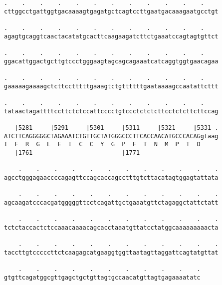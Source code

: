 \documentclass{article}
\begin{document}
\begin{Verbatim}
.    .    .    .    .    .    .    .    .    .    .    .    
cttggcctgattggtgacaaaagtgagatgctcagtccttgaatgacaaagaatgcctgt
                                                            
.    .    .    .    .    .    .    .    .    .    .    .    
agagtgcaggtcaactacatatgcacttcaagaagatcttctgaaatccagtagtgttct
                                                            
.    .    .    .    .    .    .    .    .    .    .    .    
ggacattggactgcttgtccctgggaagtagcagcagaaatcatcaggtggtgaacagaa
                                                            
.    .    .    .    .    .    .    .    .    .    .    .    
gaaaaagaaaagctcttcctttttgaaagtctgttttttgaataaaagccaatattcttt
                                                            
.    .    .    .    .    .    .    .    .    .    .    .    
tataactagattttccttctctccattcccctgtccctctctcttcctctcttcttccag
                                                            
   |5281     |5291     |5301     |5311     |5321     |5331 .
ATCTTCAGGGGGCTAGAAATCTGTTGCTATGGGCCCTTCACCAACATGCCCACAGgtaag
I  F  R  G  L  E  I  C  C  Y  G  P  F  T  N  M  P  T  D     
   |1761                         |1771                      
  
    .    .    .    .    .    .    .    .    .    .    .    .
agcctgggagaaccccagagttccagcaccagcctttgtcttacatagtggagtattata
                                                            
    .    .    .    .    .    .    .    .    .    .    .    .
agcaagatcccacgatgggggttcctcagattgctgaaatgttctagaggctattctatt
                                                            
    .    .    .    .    .    .    .    .    .    .    .    .
tctctaccactctccaaacaaaacagcacctaaatgttatcctatggcaaaaaaaaacta
                                                            
    .    .    .    .    .    .    .    .    .    .    .    .
taccttgtcccccttctcaagagcatgaaggtggttaatagttaggattcagtatgttat
                                                            
    .    .    .    .    .    .    .    .    .    .    .
gtgttcagatggcgttgagctgctgttagtgccaacatgttagtgagaaaatatc
                                                       
                                                       
 

\end{Verbatim}
\end{document}
